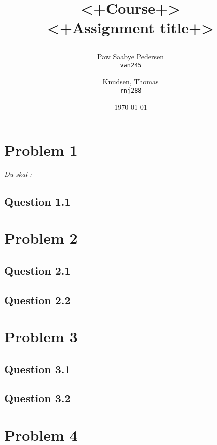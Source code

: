 \documentclass[11pt,a4paper,oneside,final,titlepage]{article}
\title{ %
    \vspace{2in}
    \LARGE{<+Course+>}\\
    \huge{<+Assignment title+>}
    \author{ %
        Paw Saabye Pedersen\\
        \texttt{vwn245}
        \and
        Knudsen, Thomas\\
        \texttt{rnj288}
    }
    \date{\today}
}
\begin{document}
\maketitle
\thispagestyle{empty}

\clearpage
\thispagestyle{empty}

\thispagestyle{fancyplain}
\setcounter{page}{1}

\section*{Problem 1}
\textit{Du skal :}


\subsection*{Question 1.1}
\textit{}

\section*{Problem 2}
\textit{}

\subsection*{Question 2.1}
\textit{}

\subsection*{Question 2.2}
\textit{}

\section*{Problem 3}

\subsection*{Question 3.1}

\subsection*{Question 3.2}

\section*{Problem 4}
\end{document}

